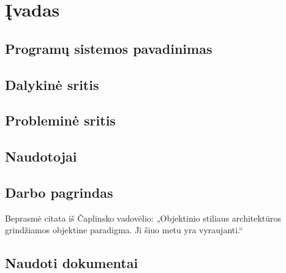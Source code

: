 \chapter{Įvadas}


\section{Programų sistemos pavadinimas}

\section{Dalykinė sritis}

\section{Probleminė sritis}

\section{Naudotojai}

\section{Darbo pagrindas}

Beprasmė citata iš Čaplinsko vadovėlio: „Objektinio stiliaus architektūros
grindžiamos objektine paradigma. Ji šiuo metu yra 
vyraujanti.“\cite[50]{cap_psi2}

\section{Naudoti dokumentai}



